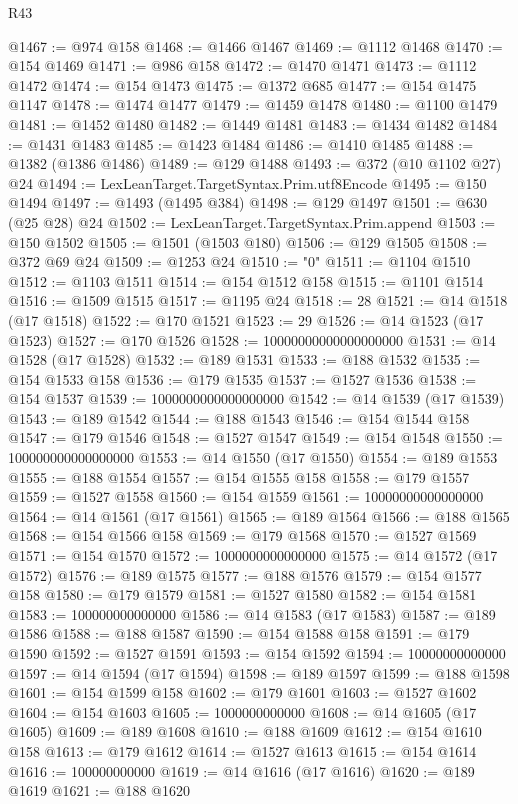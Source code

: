 \begin{lexlean}{R43}
\begin{coremodule}
@1467 := @974 @158
@1468 := @1466 @1467
@1469 := @1112 @1468
@1470 := @154 @1469
@1471 := @986 @158
@1472 := @1470 @1471
@1473 := @1112 @1472
@1474 := @154 @1473
@1475 := @1372 @685
@1477 := @154 @1475 @1147
@1478 := @1474 @1477
@1479 := @1459 @1478
@1480 := @1100 @1479
@1481 := @1452 @1480
@1482 := @1449 @1481
@1483 := @1434 @1482
@1484 := @1431 @1483
@1485 := @1423 @1484
@1486 := @1410 @1485
@1488 := @1382 (@1386 @1486)
@1489 := @129 @1488
@1493 := @372 (@10 @1102 @27) @24
@1494 := LexLeanTarget.TargetSyntax.Prim.utf8Encode
@1495 := @150 @1494
@1497 := @1493 (@1495 @384)
@1498 := @129 @1497
@1501 := @630 (@25 @28) @24
@1502 := LexLeanTarget.TargetSyntax.Prim.append
@1503 := @150 @1502
@1505 := @1501 (@1503 @180)
@1506 := @129 @1505
@1508 := @372 @69 @24
@1509 := @1253 @24
@1510 := "0"
@1511 := @1104 @1510
@1512 := @1103 @1511
@1514 := @154 @1512 @158
@1515 := @1101 @1514
@1516 := @1509 @1515
@1517 := @1195 @24
@1518 := 28
@1521 := @14 @1518 (@17 @1518)
@1522 := @170 @1521
@1523 := 29
@1526 := @14 @1523 (@17 @1523)
@1527 := @170 @1526
@1528 := 10000000000000000000
@1531 := @14 @1528 (@17 @1528)
@1532 := @189 @1531
@1533 := @188 @1532
@1535 := @154 @1533 @158
@1536 := @179 @1535
@1537 := @1527 @1536
@1538 := @154 @1537
@1539 := 1000000000000000000
@1542 := @14 @1539 (@17 @1539)
@1543 := @189 @1542
@1544 := @188 @1543
@1546 := @154 @1544 @158
@1547 := @179 @1546
@1548 := @1527 @1547
@1549 := @154 @1548
@1550 := 100000000000000000
@1553 := @14 @1550 (@17 @1550)
@1554 := @189 @1553
@1555 := @188 @1554
@1557 := @154 @1555 @158
@1558 := @179 @1557
@1559 := @1527 @1558
@1560 := @154 @1559
@1561 := 10000000000000000
@1564 := @14 @1561 (@17 @1561)
@1565 := @189 @1564
@1566 := @188 @1565
@1568 := @154 @1566 @158
@1569 := @179 @1568
@1570 := @1527 @1569
@1571 := @154 @1570
@1572 := 1000000000000000
@1575 := @14 @1572 (@17 @1572)
@1576 := @189 @1575
@1577 := @188 @1576
@1579 := @154 @1577 @158
@1580 := @179 @1579
@1581 := @1527 @1580
@1582 := @154 @1581
@1583 := 100000000000000
@1586 := @14 @1583 (@17 @1583)
@1587 := @189 @1586
@1588 := @188 @1587
@1590 := @154 @1588 @158
@1591 := @179 @1590
@1592 := @1527 @1591
@1593 := @154 @1592
@1594 := 10000000000000
@1597 := @14 @1594 (@17 @1594)
@1598 := @189 @1597
@1599 := @188 @1598
@1601 := @154 @1599 @158
@1602 := @179 @1601
@1603 := @1527 @1602
@1604 := @154 @1603
@1605 := 1000000000000
@1608 := @14 @1605 (@17 @1605)
@1609 := @189 @1608
@1610 := @188 @1609
@1612 := @154 @1610 @158
@1613 := @179 @1612
@1614 := @1527 @1613
@1615 := @154 @1614
@1616 := 100000000000
@1619 := @14 @1616 (@17 @1616)
@1620 := @189 @1619
@1621 := @188 @1620

\end{coremodule}
\end{lexlean}
